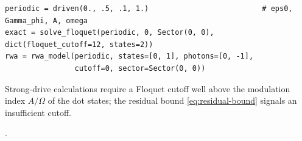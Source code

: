 \begin{incode}
\begin{lstlisting}[frame=none,backgroundcolor={},aboveskip=0pt,belowskip=0pt]
periodic = driven(0., .5, .1, 1.)                          # eps0, Gamma_phi, A, omega
exact = solve_floquet(periodic, 0, Sector(0, 0), dict(floquet_cutoff=12, states=2))
rwa = rwa_model(periodic, states=[0, 1], photons=[0, -1],
                cutoff=0, sector=Sector(0, 0))
\end{lstlisting}
Strong-drive calculations require a Floquet cutoff well above the modulation index
$A/\Omega$ of the dot states; the residual bound \eqref{eq:residual-bound} signals an
insufficient cutoff.
\par\smallskip{}.
\end{incode}

